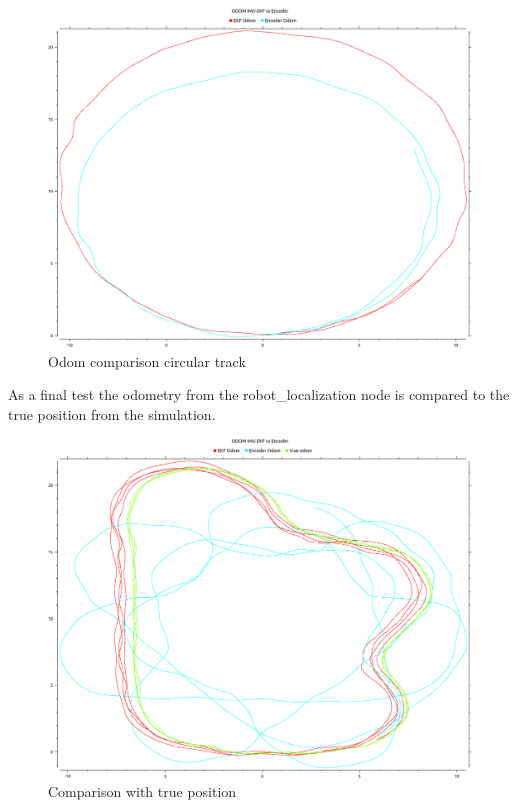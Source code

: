 \begin{figure}[H]
	\includegraphics[width=\textwidth]{Pictures/circle odom}
	\caption{Odom comparison circular track}
	\label{circular track}

\end{figure}

As a final test the odometry from the robot\_localization node is compared to the true position from the simulation.

 \begin{figure}[H]
	\includegraphics[width=\textwidth]{Pictures/odom with true}
	\caption{Comparison with true position}
	\label{trueodom}
\end{figure}

